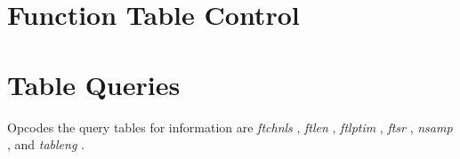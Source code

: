 \begin{comment}
\documentclass[10pt]{article}
\usepackage{fullpage, graphicx, url}
\setlength{\parskip}{1ex}
\setlength{\parindent}{0ex}
\title{Function Table Control}



\begin{tabular}{ccc}
The Alternative Csound Reference Manual & & \\
Previous & &Next

\end{tabular}

\end{comment}
\section{Function Table Control}
\section{Table Queries}


  Opcodes the query tables for information are \emph{ftchnls}
, \emph{ftlen}
, \emph{ftlptim}
, \emph{ftsr}
, \emph{nsamp}
, and \emph{tableng}
. 


\begin{comment}
\begin{tabular}{lcr}
Previous &Home &Next \\
Time Reading &Up &Read/Write Operations

\end{tabular}



\end{comment}
